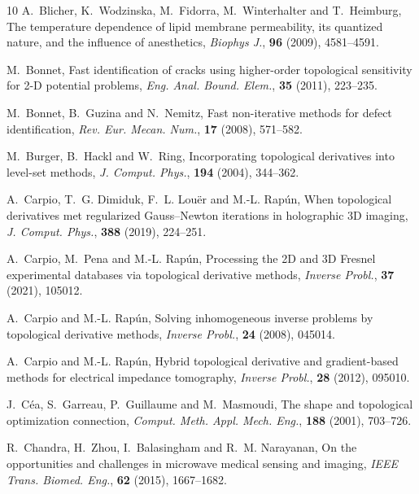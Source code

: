 \documentclass[a4,10pt]{article}
\theoremstyle{plain}
\theoremstyle{remark}
\begin{document}
\begin{thebibliography}{10}
\newblock A.~Blicher, K.~Wodzinska, M.~Fidorra, M.~Winterhalter and
  T.~Heimburg,
\newblock The temperature dependence of lipid membrane permeability, its
  quantized nature, and the influence of anesthetics,
\newblock \emph{Biophys J.}, \textbf{96} (2009), 4581--4591.

\newblock M.~Bonnet,
\newblock Fast identification of cracks using higher-order topological
  sensitivity for 2-{D} potential problems,
\newblock \emph{Eng. Anal. Bound. Elem.}, \textbf{35} (2011), 223--235.

\newblock M.~Bonnet, B.~Guzina and N.~Nemitz,
\newblock Fast non-iterative methods for defect identification,
\newblock \emph{Rev. Eur. Mecan. Num.}, \textbf{17} (2008), 571--582.

\newblock M.~Burger, B.~Hackl and W.~Ring,
\newblock Incorporating topological derivatives into level-set methods,
\newblock \emph{J. Comput. Phys.}, \textbf{194} (2004), 344--362.

\newblock A.~Carpio, T.~G. Dimiduk, F.~L. Lou{\"e}r and M.-L. Rap{\'u}n,
\newblock When topological derivatives met regularized {G}auss--{N}ewton
  iterations in holographic 3{D} imaging,
\newblock \emph{J. Comput. Phys.}, \textbf{388} (2019), 224--251.

\newblock A.~Carpio, M.~Pena and M.-L. Rap{\'u}n,
\newblock Processing the 2{D} and 3{D} {F}resnel experimental databases via
  topological derivative methods,
\newblock \emph{Inverse Probl.}, \textbf{37} (2021), 105012.

\newblock A.~Carpio and M.-L. Rap{\'u}n,
\newblock Solving inhomogeneous inverse problems by topological derivative
  methods,
\newblock \emph{Inverse Probl.}, \textbf{24} (2008), 045014.

\newblock A.~Carpio and M.-L. Rap{\'u}n,
\newblock Hybrid topological derivative and gradient-based methods for
  electrical impedance tomography,
\newblock \emph{Inverse Probl.}, \textbf{28} (2012), 095010.

\newblock J.~C{\'e}a, S.~Garreau, P.~Guillaume and M.~Masmoudi,
\newblock The shape and topological optimization connection,
\newblock \emph{Comput. Meth. Appl. Mech. Eng.}, \textbf{188} (2001), 703--726.

\newblock R.~Chandra, H.~Zhou, I.~Balasingham and R.~M. Narayanan,
\newblock On the opportunities and challenges in microwave medical sensing and
  imaging,
\newblock \emph{IEEE Trans. Biomed. Eng.}, \textbf{62} (2015), 1667--1682.


\end{thebibliography}
\end{document}
